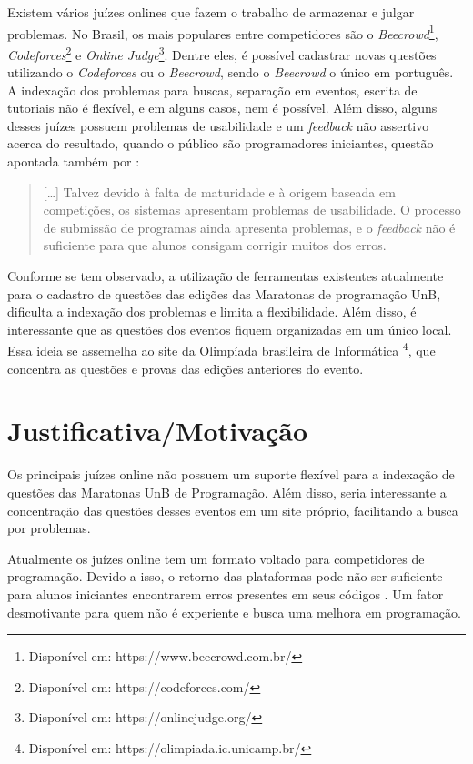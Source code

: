 Existem vários juízes onlines que fazem o trabalho de armazenar e julgar problemas. No Brasil, os mais populares entre competidores são o \textit{Beecrowd}\footnote{Disponível em: https://www.beecrowd.com.br/}, \textit{Codeforces}\footnote{Disponível em: https://codeforces.com/} e \textit{Online Judge}\footnote{Disponível em: https://onlinejudge.org/}. Dentre eles, é possível cadastrar novas questões utilizando o \textit{Codeforces} ou o \textit{Beecrowd}, sendo o \textit{Beecrowd} o único em português. A indexação dos problemas para buscas, separação em eventos, escrita de tutoriais não é flexível, e em alguns casos, nem é possível. Além disso, alguns desses juízes possuem problemas de usabilidade e um \textit{feedback} não assertivo acerca do resultado, quando o público são programadores iniciantes, questão apontada também por :
\begin{quotation}
     [\dots] Talvez devido à falta de maturidade e à origem baseada em competições, os sistemas apresentam problemas de usabilidade. O processo de submissão de programas ainda apresenta problemas, e o \textit{feedback} não é suficiente para que alunos consigam corrigir muitos dos erros.
\end{quotation}

Conforme se tem observado, a utilização de ferramentas existentes atualmente para o cadastro de questões das edições das Maratonas de programação UnB, dificulta a indexação dos problemas e limita a flexibilidade. Além disso, é interessante que as questões dos eventos fiquem organizadas em um único local. Essa ideia se assemelha ao site da Olimpíada brasileira de Informática \footnote{Disponível em: https://olimpiada.ic.unicamp.br/}, que concentra as questões e provas das edições anteriores do evento.

\section{Justificativa/Motivação}
\label{sec:justificativa}

Os principais juízes online não possuem um suporte flexível para a indexação de questões das Maratonas UnB de Programação. Além disso, seria interessante a concentração das questões desses eventos em um site próprio, facilitando a busca por problemas.

Atualmente os juízes online tem um formato voltado para competidores de programação. Devido a isso, o retorno das plataformas pode não ser suficiente para alunos iniciantes encontrarem erros presentes em seus códigos \cite{francisco2016juiz}. Um fator desmotivante para quem não é experiente e busca uma melhora em programação.

